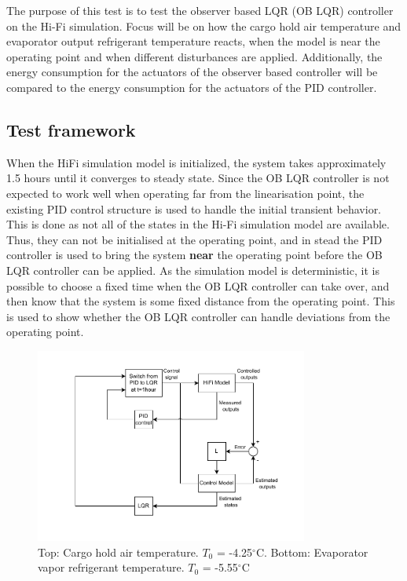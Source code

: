 The purpose of this test is to test the observer based LQR (OB LQR) controller on the Hi-Fi simulation. Focus will be on how the cargo hold air temperature and evaporator output refrigerant temperature reacts, when the model is near the operating point and when different disturbances are applied. Additionally, the energy consumption for the actuators of the observer based controller will be compared to the energy consumption for the actuators of the PID controller.

\subsection{Test framework}
When the HiFi simulation model is initialized, the system takes approximately 1.5 hours until it converges to steady state. Since the OB LQR controller is not expected to work well when operating far from the linearisation point, the existing PID control structure is used to handle the initial transient behavior. This is done as not all of the states in the Hi-Fi simulation model are available. Thus, they can not be initialised at the operating point, and in stead the PID controller is used to bring the system \textbf{near} the operating point before the OB LQR controller can be applied. 
As the simulation model is deterministic, it is possible to choose a fixed time when the OB LQR controller can take over, and then know that the system is some fixed distance from the operating point. This is used to show whether the OB LQR controller can handle deviations from the operating point.

\begin{figure}[h!]
	\centering
	\includegraphics[width=0.8\textwidth]{Graphics/HiFi_simulation_test_diagram.pdf}
	\caption{Top: Cargo hold air temperature. $T_0$ = -4.25$^{\circ}$C. Bottom: Evaporator vapor refrigerant temperature. $T_0$ = -5.55$^{\circ}$C}
	\label{fig:test_setup}
\end{figure}

